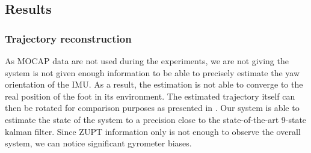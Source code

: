 \subsection{Results}
\subsubsection{Trajectory reconstruction}

As MOCAP data are not used during the experiments, we are not giving the system is not given enough information to be able to precisely estimate the yaw orientation of the IMU. 
As a result, the estimation is not able to converge to the real position of the foot in its environment. The estimated trajectory itself can then be rotated for comparison purposes as presented in .
Our system is able to estimate the state of the system to a precision close to the state-of-the-art 9-state kalman filter.
Since ZUPT information only is not enough to observe the overall system, we can notice significant gyrometer biases.


